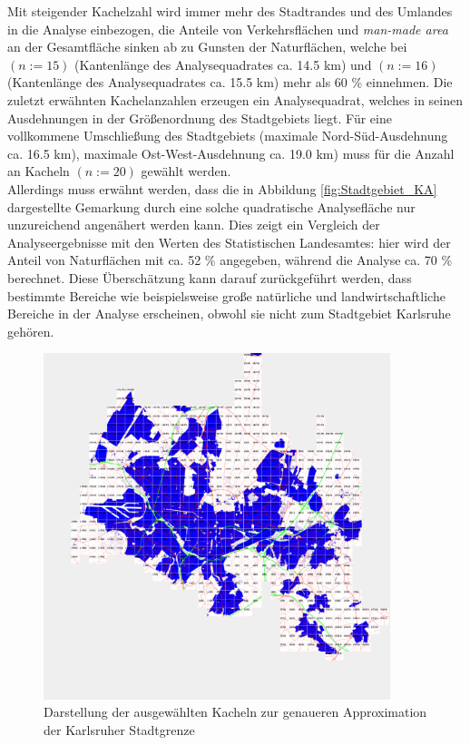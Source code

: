 Mit steigender Kachelzahl wird immer mehr des Stadtrandes und des Umlandes in die Analyse einbezogen, die Anteile von Verkehrsflächen und \textit{man-made area} an der Gesamtfläche sinken ab zu Gunsten der Naturflächen, welche bei  \((n:=15)\) (Kantenlänge des Analysequadrates ca. \num{14.5} \si{\kilo\metre}) und  \((n:=16)\) (Kantenlänge des Analysequadrates ca. \num{15.5} \si{\kilo\metre}) mehr als \num{60} \% einnehmen. Die zuletzt erwähnten Kachelanzahlen erzeugen ein Analysequadrat, welches in seinen Ausdehnungen in der Größenordnung des Stadtgebiets liegt. Für eine vollkommene Umschließung des Stadtgebiets (maximale Nord-Süd-Ausdehnung ca. \num{16.5} \si{\kilo\metre}), maximale Ost-West-Ausdehnung ca. \num{19.0} \si{\kilo\metre}) muss für die Anzahl an Kacheln \((n:=20)\) gewählt werden.\\
\newline
Allerdings muss erwähnt werden, dass die in Abbildung \ref{fig:Stadtgebiet_KA} dargestellte Gemarkung durch eine solche quadratische Analysefläche nur unzureichend angenähert werden kann. Dies zeigt ein Vergleich der Analyseergebnisse mit den Werten des Statistischen Landesamtes: hier wird der Anteil von Naturflächen mit ca. \num{52} \% angegeben, während die Analyse ca. \num{70} \% berechnet. Diese Überschätzung kann darauf zurückgeführt werden, dass bestimmte Bereiche wie beispielsweise große natürliche und landwirtschaftliche Bereiche in der Analyse erscheinen, obwohl sie nicht zum Stadtgebiet Karlsruhe gehören.\\
%
\begin{figure}
  \centering
    \includegraphics[width=0.9\textwidth]{images/3_KA_Kacheln_skip_ohne_zahlen.png}
    \caption{Darstellung der ausgewählten Kacheln zur genaueren Approximation der Karlsruher Stadtgrenze}
    \label{fig:Karlsruhe_skip_tiles}
\end{figure}
